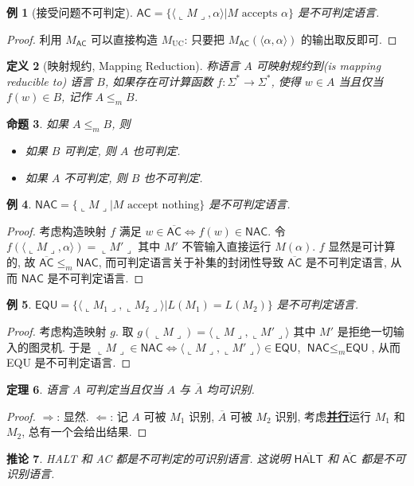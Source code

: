 \documentclass[8pt]{article}
\theoremstyle{compact}
\newtheorem{theorem}{定理}[section]
\newtheorem{definition}[theorem]{定义}
\newtheorem{proposition}[theorem]{命题}
\newtheorem{corollary}[theorem]{推论}
\newtheorem{example}[theorem]{例}
\def\obj#1{\textbf{\uline{#1}}}
\def\le{\leqslant}
\def\rep#1{\llcorner{#1}\lrcorner}
\begin{document}
\begin{example}[接受问题不可判定]
	$\textsf{AC} = \{\langle \rep M, \alpha \rangle | M \text{ accepts } \alpha\}$ 是不可判定语言.	
\end{example}
\begin{proof}
	利用 $M_{\textsf{AC}}$ 可以直接构造 $M_{\text{UC}}$: 只要把 $M_{\textsf{AC}}(\langle \alpha, \alpha \rangle)$ 的输出取反即可.
\end{proof}
\begin{definition}[映射规约, Mapping Reduction]
	称语言 $A$ 可映射规约到(is mapping reducible to) 语言 $B$, 如果存在可计算函数 $f: \Sigma^* \to \Sigma^*$, 使得 $w \in A$ 当且仅当 $f(w) \in B$, 记作 $A \le_m B$.
\end{definition}
\begin{proposition} 如果 $A \le_m B$, 则
	\begin{itemize}
		\item 如果 $B$ 可判定, 则 $A$ 也可判定.
		\item 如果 $A$ 不可判定, 则 $B$ 也不可判定.
	\end{itemize}
\end{proposition}
\begin{example}
	$\textsf{NAC} = \{\rep M | M \text{ accept nothing}\}$ 是不可判定语言.
\end{example}
\begin{proof}
	考虑构造映射 $f$ 满足 $w \in \overline{\textsf{AC}} \Leftrightarrow f(w) \in \textsf{NAC}$. 令 $f(\langle \rep M, \alpha \rangle) = \rep{M'}$ 其中 $M'$ 不管输入直接运行 $M(\alpha)$. $f$ 显然是可计算的, 故 $\overline{\textsf{AC}} \le_m \textsf{NAC}$, 而可判定语言关于补集的封闭性导致 $\overline{\textsf{AC}}$ 是不可判定语言, 从而 $\textsf{NAC}$ 是不可判定语言.
\end{proof}
\begin{example}
	$\textsf{EQU} = \{\langle \rep{M_1}, \rep{M_2} \rangle | L(M_1) = L(M_2)\}$ 是不可判定语言.
\end{example}
\begin{proof}
	考虑构造映射 $g$. 取 $g(\rep{M}) = \langle \rep{M}, \rep{M'}\rangle$ 其中 $M'$ 是拒绝一切输入的图灵机. 于是 $\rep{M} \in \textsf{NAC} \Leftrightarrow \langle \rep{M}, \rep{M'}\rangle \in \textsf{EQU}$, $\textsf{NAC} \le_m \textsf{EQU}$, 从而 \textsf{EQU} 是不可判定语言.
\end{proof}
\begin{theorem}
	语言 $A$ 可判定当且仅当 $A$ 与 $\overline{A}$ 均可识别.
\end{theorem}
\begin{proof}
	$\Rightarrow$: 显然. $\Leftarrow$: 记 $A$ 可被 $M_1$ 识别, $\overline A$ 可被 $M_2$ 识别, 考虑\obj{并行}运行 $M_1$ 和 $M_2$, 总有一个会给出结果. 
\end{proof}
\begin{corollary}
	\textsf{HALT} 和 \textsf{AC} 都是不可判定的可识别语言. 这说明 $\overline{\textsf{HALT}}$ 和 $\overline{\textsf{AC}}$ 都是不可识别语言.
\end{corollary}
\end{document}
